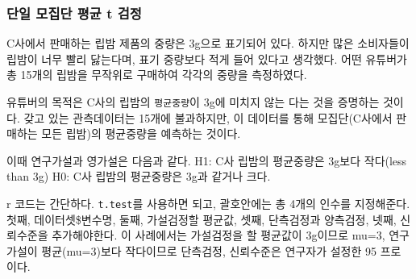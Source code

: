\documentclass[
]{book}
\begin{document}
\subsubsection{단일 모집단 평균 t 검정}\label{uxb2e8uxc77c-uxbaa8uxc9d1uxb2e8-uxd3c9uxade0-t-uxac80uxc815}

C사에서 판매하는 립밤 제품의 중량은 3g으로 표기되어 있다. 하지만 많은 소비자들이 립밤이 너무 빨리 닳는다며, 표기 중량보다 적게 들어 있다고 생각했다. 어떤 유튜버가 총 15개의 립밤을 무작위로 구매하여 각각의 중량을 측정하였다.

유튜버의 목적은 C사의 립밤의 \texttt{평균중량}이 3g에 미치지 않는 다는 것을 증명하는 것이다. 갖고 있는 관측데이터는 15개에 불과하지만, 이 데이터를 통해 모집단(C사에서 판매하는 모든 립밤)의 평균중량을 예측하는 것이다.

이때 연구가설과 영가설은 다음과 같다.
H1: C사 립밤의 평균중량은 3g보다 작다(less than 3g)
H0: C사 립밤의 평균중량은 3g과 같거나 크다.

r 코드는 간단하다. \texttt{t.test}를 사용하면 되고, 괄호안에는 총 4개의 인수를 지정해준다. 첫째, 데이터셋\$변수명, 둘째, 가설검정할 평균값, 셋째, 단측검정과 양측검정, 넷째, 신뢰수준을 추가해야한다. 이 사례에서는 가설검정을 할 평균값이 3g이므로 mu=3, 연구가설이 평균(mu=3)보다 작다이므로 단측검정, 신뢰수준은 연구자가 설정한 95 프로 이다.
\end{document}
